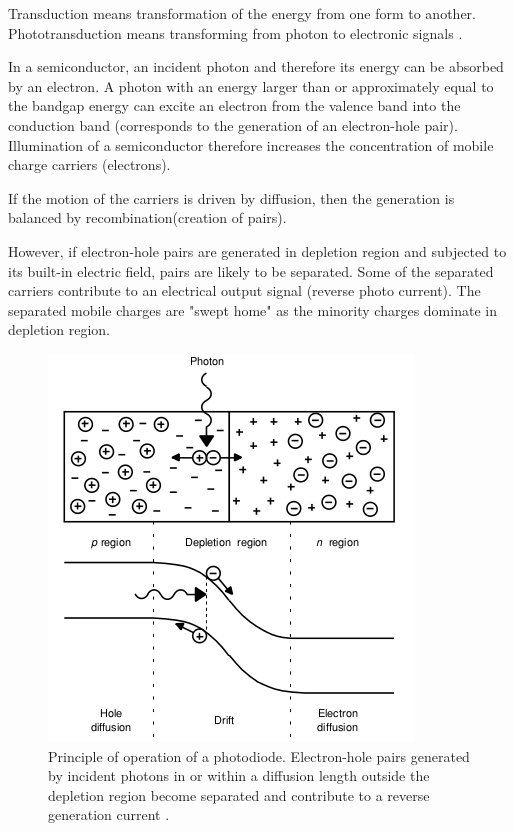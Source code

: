 \documentclass[main]{subfiles}
\begin{document}
Transduction means transformation of the energy from one form to another. Phototransduction means transforming from photon to electronic signals \cite{lab8}.

In a semiconductor, an incident photon and therefore its energy can be absorbed by an electron. A
photon with an energy larger than or approximately equal to the bandgap energy can excite an electron from the valence band into the conduction band
(corresponds to the generation of an electron-hole pair). Illumination of a semiconductor therefore increases the concentration of mobile charge carriers (electrons). 

If the motion of the carriers is driven by diffusion, then the
generation is balanced by recombination(creation of pairs).

However, if electron-hole pairs are generated in depletion region and subjected to its built-in electric field, pairs are likely to be separated.  
Some of the separated carriers contribute to an electrical output signal (reverse photo current). The separated mobile charges are "swept home" as the minority charges dominate in depletion region. 

\begin{figure}[htbp]
  \centering
  \includegraphics[scale=0.8]{pics/photodiode_principle.jpg}
  \caption{Principle of operation of a photodiode. Electron-hole pairs generated by incident photons in or
within a diffusion length outside the depletion region become separated and contribute to a reverse
generation current \cite{book:VLSI}.}
  \label{fig:photodiode_principle}
\end{figure} 
\end{document}
